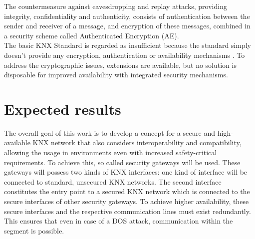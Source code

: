 \documentclass[a4paper,11pt,oneside]{memoir}
\begin{document}
The countermeasure against eavesdropping and replay attacks, providing integrity, confidentiality and authenticity, consists of authentication
between the sender and receiver of a message, and encryption of these messages, combined in a security scheme
called Authenticated Encryption (AE).
\\

The basic KNX Standard is regarded as insufficient because the standard simply doesn't provide any encryption, authentication 
or availability mechanisms \cite{knxSpec}. To address the cryptographic issues, extensions are available, but no solution is disposable for 
improved availability with integrated security mechanisms.


\section{Expected results}

The overall goal of this work is to develop a concept for a secure and high-available KNX network that also considers interoperability and compatibility, 
allowing the usage in environments even with increased safety-critical requirements. 
To achieve this, so called security gateways will be used. These gateways will possess two kinds of KNX interfaces: one kind of interface will be
connected to standard, unsecured KNX networks.
The second interface constitutes the entry point to a secured KNX network which is connected to the secure interfaces of other
security gateways. To achieve higher availability, these secure interfaces and the respective communication lines must exist redundantly. This ensures that
even in case of a DOS attack, communication within the segment is possible.
\end{document}
